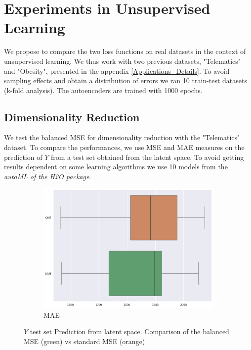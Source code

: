 \documentclass{article}
\theoremstyle{definition}
\begin{document}
\section{Experiments in Unsupervised Learning} 
\label{XP_unsupervised}
We propose to compare the two loss functions on real datasets in the context of unsupervised learning. We thus work with two previous datasets, "Telematics" and "Obesity", presented in the appendix \ref{Applications_Details}. To avoid sampling effects and obtain a distribution of errors we ran 10 train-test datasets (k-fold analysis). The autoencoders are trained with 1000 epochs.

\subsection{Dimensionality Reduction}
We test the balanced MSE for dimensionality reduction with the "Telematics" dataset. To compare the performances, we use MSE and MAE measures on the prediction of $Y$ from a test set obtained from the latent space. To avoid getting results dependent on some learning algorithms we use 10 models from the \textit{autoML of the H2O package}.

\begin{figure}[ht]
     \centering
     \begin{subfigure}[b]{0.25\textwidth}
         \centering
         \includegraphics[width=\textwidth]{imgs/Telematics/boxplot_MAE_DimRed.png}
         \caption{MAE}
         \label{MAE_DimRed}
     \end{subfigure}
     \caption{$Y$ test set Prediction from latent space. Comparison of the balanced MSE (green) vs standard MSE (orange)}
     \label{DimRed}
\end{figure}
\end{document}
